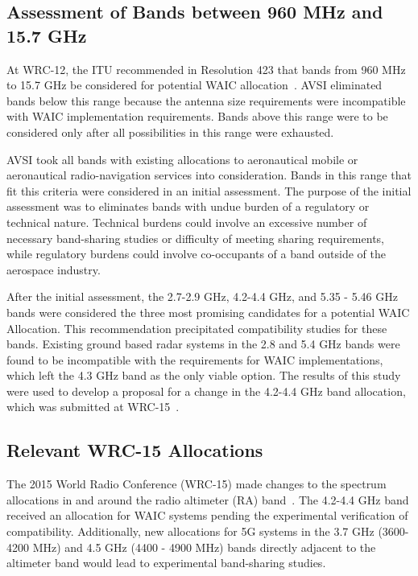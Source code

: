 \subsection{Assessment of Bands between 960 MHz and 15.7 GHz}
At WRC-12, the ITU recommended in Resolution 423 that bands from 960 MHz to 15.7 GHz be considered for potential WAIC allocation~\cite{noauthor_consideration_2014}. AVSI eliminated bands below this range because the antenna size requirements were incompatible with WAIC implementation requirements. Bands above this range were to be considered only after all possibilities in this range were exhausted. 

AVSI took all bands with existing allocations to aeronautical mobile or aeronautical radio-navigation services into consideration. Bands in this range that fit this criteria were considered in an initial assessment. The purpose of the initial assessment was to eliminates bands with undue burden of a regulatory or technical nature. Technical burdens could involve an excessive number of necessary band-sharing studies or difficulty of meeting sharing requirements, while regulatory burdens could involve co-occupants of a band outside of the aerospace industry. 

After the initial assessment, the 2.7-2.9 GHz, 4.2-4.4 GHz, and 5.35 - 5.46 GHz bands were considered the three most promising candidates for a potential WAIC Allocation. This recommendation precipitated compatibility studies for these bands. Existing ground based radar systems in the 2.8 and 5.4 GHz bands were found to be incompatible with the requirements for WAIC implementations, which left the 4.3 GHz band as the only viable option. The results of this study were used to develop a proposal for a change in the 4.2-4.4 GHz band allocation, which was submitted at WRC-15~\cite{noauthor_consideration_2014}. 

\subsection{Relevant WRC-15 Allocations}
The 2015 World Radio Conference (WRC-15) made changes to the spectrum allocations in and around the radio altimeter (RA) band~\cite{noauthor_final_2015}. The 4.2-4.4 GHz band received an allocation for WAIC systems pending the experimental verification of compatibility. Additionally, new allocations for 5G systems in the 3.7 GHz (3600-4200 MHz) and 4.5 GHz (4400 - 4900 MHz) bands directly adjacent to the altimeter band would lead to experimental band-sharing studies. 

